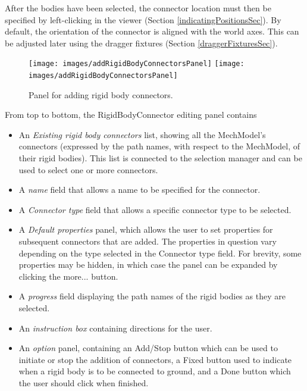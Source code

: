 \documentclass{article}
\begin{document}
After the bodies have been selected, the connector location must then be
specified by left-clicking in the viewer (Section \ref{indicatingPositionsSec}).
By default, the orientation of the connector is aligned with the world
axes. This can be adjusted later using the dragger fixtures 
(Section \ref{draggerFixturesSec}).

\begin{figure}
\begin{center}
\iflatexml
\texttt{[image: images/addRigidBodyConnectorsPanel]}
\else
\texttt{[image: images/addRigidBodyConnectorsPanel]}
\fi
\end{center}
\caption{Panel for adding rigid body connectors.}%
\label{addRigidBodyConnectorsPanelFig}
\end{figure}

From top to bottom, the RigidBodyConnector editing panel contains

\begin{itemize}

\item An {\it Existing rigid body connectors} list, showing all the MechModel's
connectors (expressed by the path names, with respect to the MechModel,
of their rigid bodies). This list is connected to the selection manager and
can be used to select one or more connectors.

\item A {\it name} field that allows a name to be specified for the connector.

\item A {\it Connector type} field that allows a specific connector
type to be selected.

\item A {\it Default properties} panel, which allows the user to set
properties for subsequent connectors that are added. The properties in
question vary depending on the type selected in the {\sf Connector type}
field. For brevity, some properties may be hidden, in which case the
panel can be expanded by clicking the {\sf more...} button.

\item A {\it progress} field displaying the path names of the rigid bodies
as they are selected.

\item An {\it instruction box} containing directions for the user.

\item An {\it option} panel, containing an {\sf Add/Stop} button which can be used
to initiate or stop the addition of connectors, a {\sf Fixed} button used
to indicate when a rigid body is to be connected to ground, and a
{\sf Done} button which the user should click when finished.

\end{itemize}
\end{document}
